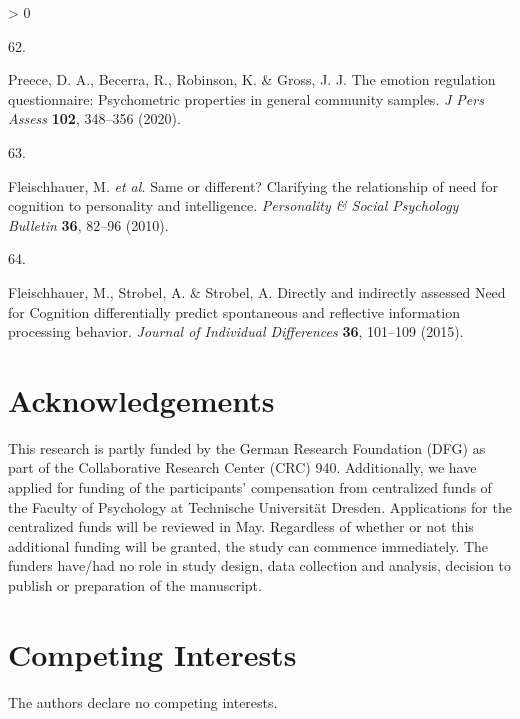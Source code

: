 \documentclass[
  english,
  man,floatsintext]{apa6}
\newlength{\cslhangindent}
\newlength{\csllabelwidth}
\newenvironment{CSLReferences}[2] %
 {%
  \setlength{\parindent}{0pt}
  \ifodd #1 \everypar{\setlength{\hangindent}{\cslhangindent}}\ignorespaces\fi
  \ifnum #2 > 0
  \setlength{\parskip}{#2\baselineskip}
  \fi
 }%
 {}
\newcommand{\CSLLeftMargin}[1]{\parbox[t]{\csllabelwidth}{#1}}
\newcommand{\CSLRightInline}[1]{\parbox[t]{\linewidth - \csllabelwidth}{#1}\break}
\begin{document}
\begin{CSLReferences}{0}{0}
\leavevmode\hypertarget{ref-Preece2020}{}%
\CSLLeftMargin{62. }
\CSLRightInline{Preece, D. A., Becerra, R., Robinson, K. \& Gross, J. J. The emotion regulation questionnaire: Psychometric properties in general community samples. \emph{J Pers Assess} \textbf{102}, 348--356 (2020).}

\leavevmode\hypertarget{ref-Fleischhauer2010}{}%
\CSLLeftMargin{63. }
\CSLRightInline{Fleischhauer, M. \emph{et al.} Same or different? {Clarifying} the relationship of need for cognition to personality and intelligence. \emph{Personality \& Social Psychology Bulletin} \textbf{36}, 82--96 (2010).}

\leavevmode\hypertarget{ref-Fleischhauer2015}{}%
\CSLLeftMargin{64. }
\CSLRightInline{Fleischhauer, M., Strobel, A. \& Strobel, A. Directly and indirectly assessed {N}eed for {C}ognition differentially predict spontaneous and reflective information processing behavior. \emph{Journal of Individual Differences} \textbf{36}, 101--109 (2015).}

\end{CSLReferences}

\endgroup

\newpage

\hypertarget{acknowledgements}{%
\section{Acknowledgements}\label{acknowledgements}}

This research is partly funded by the German Research Foundation (DFG) as part of the Collaborative Research Center (CRC) 940.
Additionally, we have applied for funding of the participants' compensation from centralized funds of the Faculty of Psychology at Technische Universität Dresden.
Applications for the centralized funds will be reviewed in May.
Regardless of whether or not this additional funding will be granted, the study can commence immediately.
The funders have/had no role in study design, data collection and analysis, decision to publish or preparation of the manuscript.

\hypertarget{competing-interests}{%
\section{Competing Interests}\label{competing-interests}}

The authors declare no competing interests.

\newpage
\setcounter{figure}{0}
\end{document}
